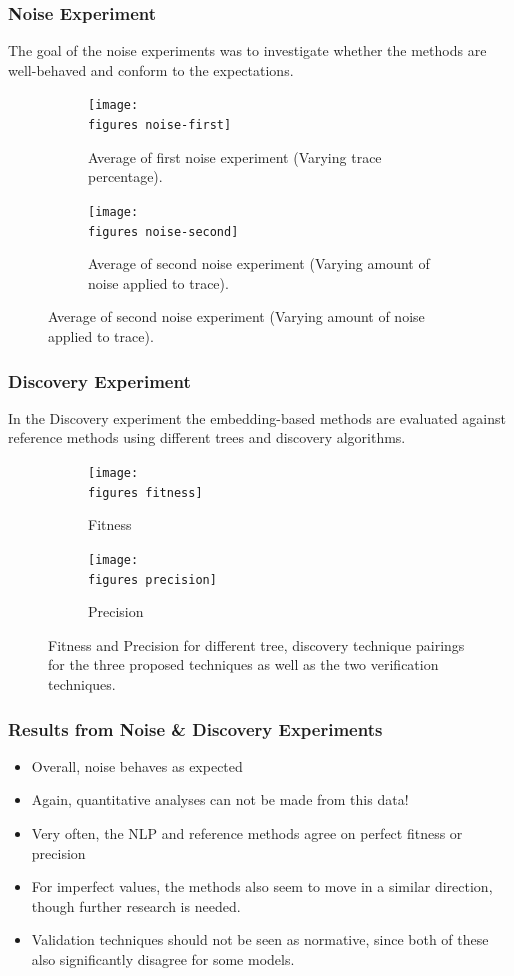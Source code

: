 \documentclass{beamer}
\newcommand{\figures}{../figures/}
\begin{document}
	
	\begin{frame}
		\frametitle{Noise Experiment}
		The goal of the noise experiments was to investigate whether the methods are well-behaved and conform to the expectations.
		\begin{figure}
			\centering
			\begin{subfigure}[b]{0.45\textwidth}
				\centering
				\texttt{[image: \\figures noise-first]}
				\caption{Average of first noise experiment (Varying trace percentage).}
				\label{fig:noise-first}
			\end{subfigure}
			\hfill
			\begin{subfigure}[b]{0.45\textwidth}
				\centering
				\texttt{[image: \\figures noise-second]}
				\caption{Average of second noise experiment (Varying amount of noise applied to trace).}
				\label{fig:noise-second}
			\end{subfigure}
		\end{figure}
	\end{frame}
	
	
	\begin{frame}
		\frametitle{Discovery Experiment}
		In the Discovery experiment the embedding-based methods are evaluated against reference methods using different trees and discovery algorithms.
		\begin{figure}
			\centering
			\begin{subfigure}[b]{0.49\textwidth}
				\centering
				\texttt{[image: \\figures fitness]}
				\caption{Fitness}
				\label{fig:fitness}
			\end{subfigure}
			\hfill
			\begin{subfigure}[b]{0.49\textwidth}
				\centering
				\texttt{[image: \\figures precision]}
				\caption{Precision}
				\label{fig:precision}
			\end{subfigure}
			\caption{Fitness and Precision for different tree, discovery technique pairings for the three proposed techniques as well as the two verification techniques.}
			\label{fig:discovery}
		\end{figure}
	\end{frame}
	
	\begin{frame}
		\frametitle{Results from Noise \& Discovery Experiments}
		\begin{itemize}
			\item Overall, noise behaves as expected
			\item Again, quantitative analyses can not be made from this data!
			\item Very often, the NLP and reference methods agree on perfect fitness or precision
			\item For imperfect values, the methods also seem to move in a similar direction, though further research is needed.
			\item Validation techniques should not be seen as normative, since both of these also significantly disagree for some models. 
		\end{itemize}
	\end{frame}
	
\end{document}
